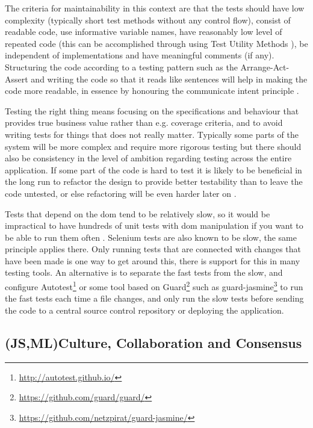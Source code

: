 \documentclass[11pt]{article}
\begin{document}
The criteria for maintainability in this context are that the tests should have low complexity (typically short test methods without any control flow), consist of readable code, use informative variable names, have reasonably low level of repeated code (this can be accomplished through using Test Utility Methods \cite[599]{TestPatterns}), be independent of implementations and have meaningful comments (if any). Structuring the code according to a testing pattern such as the Arrange-Act-Assert \cite{C2} and writing the code so that it reads like sentences will help in making the code more readable, in essence by honouring the communicate intent principle \cite[p.~41]{TestPatterns}.

Testing the right thing means focusing on the specifications and behaviour that provides true business value rather than e.g. coverage criteria, and to avoid writing tests for things that does not really matter. Typically some parts of the system will be more complex and require more rigorous testing but there should also be consistency in the level of ambition regarding testing across the entire application. If some part of the code is hard to test it is likely to be beneficial in the long run to refactor the design to provide better testability than to leave the code untested, or else refactoring will be even harder later on \cite{Refactoring}. %

Tests that depend on the \gls{dom} tend to be relatively slow, so it would be impractical to have hundreds of unit tests with \gls{dom} manipulation if you want to be able to run them often \cite[questions~21-22]{Stenmark}. Selenium tests are also known to be slow, the same principle applies there. Only running tests that are connected with changes that have been made is one way to get around this, there is support for this in many testing tools. An alternative is to separate the fast tests from the slow, and configure Autotest\footnote{\url{http://autotest.github.io/}} or some tool based on Guard\footnote{\url{https://github.com/guard/guard/}} such as guard-jasmine\footnote{\url{https://github.com/netzpirat/guard-jasmine/}} to run the fast tests each time a file changes, and only run the slow tests before sending the code to a central source control repository or deploying the application.

\subsection{(JS,ML)Culture, Collaboration and Consensus}
\label{subsec:ccc}
\end{document}
